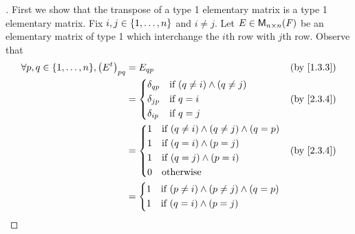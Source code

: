 \begin{proof}[]
  First we show that the transpose of a type 1 elementary matrix is a type 1 elementary matrix.
  Fix \(i, j \in \left\lbrace1, \dots, n\right\rbrace\) and \(i \neq j\).
  Let \(E \in \mathsf{M}_{{n} \times n}({\mathit{F}})\) be an elementary matrix of type 1 which interchange the \(i\)th row with \(j\)th row.
  Observe that
  \begin{align*}
    \forall p, q \in \set{1, \dots, n}, \pa{\tp{E}}_{p q} & = E_{q p}                                                   &  & \text{(by \cref{1.3.3})} \\
                                                          & = \begin{dcases}
                                                                \delta_{q p} & \text{if } (q \neq i) \land (q \neq j) \\
                                                                \delta_{j p} & \text{if } q = i                       \\
                                                                \delta_{i p} & \text{if } q = j
                                                              \end{dcases}    &  & \text{(by \cref{2.3.4})}                                   \\
                                                          & = \begin{dcases}
                                                                1 & \text{if } (q \neq i) \land (q \neq j) \land (q = p) \\
                                                                1 & \text{if } (q = i) \land (p = j)                     \\
                                                                1 & \text{if } (q = j) \land (p = i)                     \\
                                                                0 & \text{otherwise}
                                                              \end{dcases} &  & \text{(by \cref{2.3.4})}                                \\
                                                          & = \begin{dcases}
                                                                1 & \text{if } (p \neq i) \land (p \neq j) \land (q = p) \\
                                                                1 & \text{if } (q = i) \land (p = j)                     \\

\end{dcases}
\end{align*}
\end{proof}
